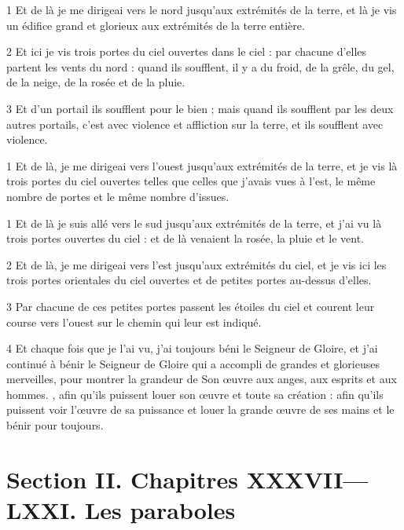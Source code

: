 
\par 1 Et de là je me dirigeai vers le nord jusqu'aux extrémités de la terre, et là je vis un édifice grand et glorieux aux extrémités de la terre entière.
\par 2 Et ici je vis trois portes du ciel ouvertes dans le ciel : par chacune d'elles partent les vents du nord : quand ils soufflent, il y a du froid, de la grêle, du gel, de la neige, de la rosée et de la pluie.
\par 3 Et d'un portail ils soufflent pour le bien ; mais quand ils soufflent par les deux autres portails, c'est avec violence et affliction sur la terre, et ils soufflent avec violence.


\par 1 Et de là, je me dirigeai vers l'ouest jusqu'aux extrémités de la terre, et je vis là trois portes du ciel ouvertes telles que celles que j'avais vues à l'est, le même nombre de portes et le même nombre d'issues.


\par 1 Et de là je suis allé vers le sud jusqu'aux extrémités de la terre, et j'ai vu là trois portes ouvertes du ciel : et de là venaient la rosée, la pluie et le vent.
\par 2 Et de là, je me dirigeai vers l'est jusqu'aux extrémités du ciel, et je vis ici les trois portes orientales du ciel ouvertes et de petites portes au-dessus d'elles.
\par 3 Par chacune de ces petites portes passent les étoiles du ciel et courent leur course vers l'ouest sur le chemin qui leur est indiqué.
\par 4 Et chaque fois que je l'ai vu, j'ai toujours béni le Seigneur de Gloire, et j'ai continué à bénir le Seigneur de Gloire qui a accompli de grandes et glorieuses merveilles, pour montrer la grandeur de Son œuvre aux anges, aux esprits et aux hommes. , afin qu'ils puissent louer son œuvre et toute sa création : afin qu'ils puissent voir l'œuvre de sa puissance et louer la grande œuvre de ses mains et le bénir pour toujours.

\part{Section II. Chapitres XXXVII—LXXI. Les paraboles}


